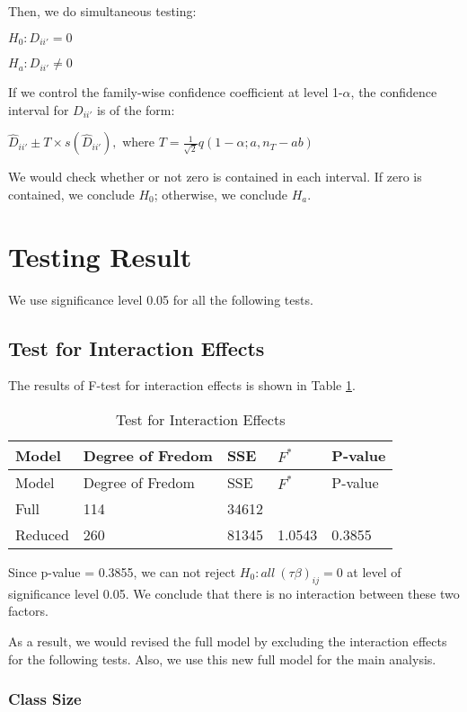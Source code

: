 \documentclass[]{article}
\begin{document}
Then, we do simultaneous testing:

\(H_0: D_{ii'} =0\)

\(H_a: D_{ii'} \neq 0\)

If we control the family-wise confidence coefficient at level 1-\(\alpha\), the confidence interval for \(D_{ii'}\) is of the form:

\(\hat D_{ii'} \pm T \times s(\hat D_{ii'}),\)
where \(T=\frac{1}{\sqrt{2}}q(1-\alpha;a,n_T-ab)\)

We would check whether or not zero is contained in each interval. If zero is contained, we conclude \(H_0\); otherwise, we conclude \(H_a\).

\hypertarget{testing-result}{%
\section{Testing Result}\label{testing-result}}

We use significance level 0.05 for all the following tests.

\hypertarget{test-for-interaction-effects-1}{%
\subsection{Test for Interaction Effects}\label{test-for-interaction-effects-1}}

The results of F-test for interaction effects is shown in Table \ref{tab:inter}.

\begin{longtable}[]{@{}lllll@{}}
\caption{\label{tab:inter} Test for Interaction Effects}\tabularnewline
\toprule
Model & Degree of Fredom & SSE & \(F^*\) & P-value\tabularnewline
\midrule
\endfirsthead
\toprule
Model & Degree of Fredom & SSE & \(F^*\) & P-value\tabularnewline
\midrule
\endhead
Full & 114 & 34612 & &\tabularnewline
Reduced & 260 & 81345 & 1.0543 & 0.3855\tabularnewline
\bottomrule
\end{longtable}

Since p-value = 0.3855, we can not reject \(H_0: all \ (\tau\beta)_{ij} = 0\) at level of significance level 0.05. We conclude that there is no interaction between these two factors.

As a result, we would revised the full model by excluding the interaction effects for the following tests. Also, we use this new full model for the main analysis.

\hypertarget{class-size-1}{%
\subsubsection{Class Size}\label{class-size-1}}
\end{document}
